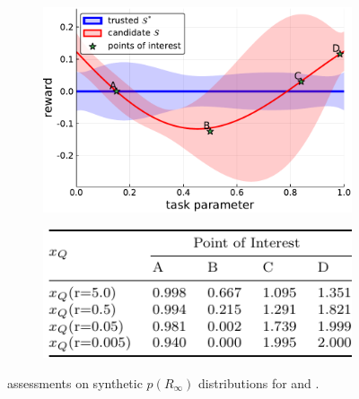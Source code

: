\begin{figure}[tbp]
    \centering
    \begin{subfigure}[c]{0.65\linewidth}
        \centering
        \includegraphics[width=0.7\linewidth]{Figures/p1.pdf}
        \vfill
    \end{subfigure}%
    \hfill
    \begin{subfigure}[t]{0.35\linewidth}
        \centering
        \includegraphics[width=1.0\linewidth]{Figures/p1_table.pdf}
    \end{subfigure} 
    \caption{\xQ{} assessments on synthetic $p(R_{\infty})$ distributions for \solvestar{} and \solve{}.} %
    \label{fig:sq_thry1}
\end{figure}
